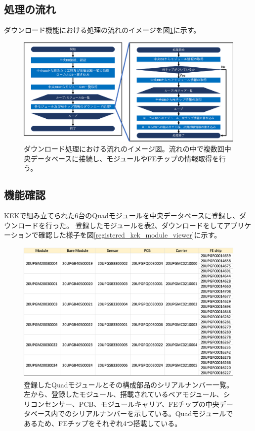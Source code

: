\subsection{処理の流れ}

ダウンロード機能における処理の流れのイメージを図\ref{download_algorithm}に示す。

\begin{figure}[b]\centering
  \begin{center}
  \includegraphics[width=15cm]{./download_tool_flow_whole.png}
  \caption[ダウンロード処理における流れのイメージ図]{ダウンロード処理における流れのイメージ図。流れの中で複数回中央データベースに接続し、モジュールやFEチップの情報取得を行う。}
  \label{download_algorithm}
  \end{center}
\end{figure}

\subsection{機能確認}
KEKで組み立てられた6台のQuadモジュールを中央データベースに登録し、ダウンロードを行った。
登録したモジュールを表\ref{registered_kek_module}、ダウンロードをしてアプリケーションで確認した様子を図\ref{registered_kek_module_viewer}に示す。

\begin{figure}[bpt]\centering
\includegraphics[width=12cm]{./registered_kek_module.png}
\caption[登録したQuadモジュールと構成部品のシリアルナンバー一覧。]{登録したQuadモジュールとその構成部品のシリアルナンバー一覧。左から、登録したモジュール、搭載されているベアモジュール、シリコンセンサー、PCB、モジュールキャリア、FEチップの中央データベース内でのシリアルナンバーを示している。Quadモジュールであるため、FEチップをそれぞれ4つ搭載している。}
\label{registered_kek_module}
\end{figure}

